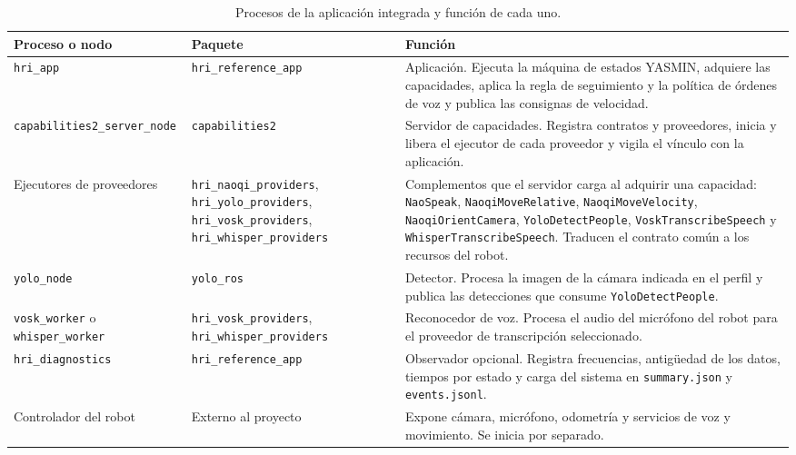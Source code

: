 \documentclass[11pt,letterpaper]{article}
\newcommand{\code}[1]{\nolinkurl{#1}}
\begin{document}
\begin{table}[htbp]
\centering\small
\caption{Procesos de la aplicación integrada y función de cada uno.}\label{tab:nodos}
\begin{tabularx}{\linewidth}{@{}P{3.6cm}P{3.3cm}Y@{}}
\toprule
Proceso o nodo & Paquete & Función \\
\midrule
\code{hri_app} & \code{hri_reference_app} & Aplicación. Ejecuta la máquina de estados YASMIN, adquiere las capacidades, aplica la regla de seguimiento y la política de órdenes de voz y publica las consignas de velocidad. \\
\code{capabilities2_server_node} & \code{capabilities2} & Servidor de capacidades. Registra contratos y proveedores, inicia y libera el ejecutor de cada proveedor y vigila el vínculo con la aplicación. \\
Ejecutores de proveedores & \code{hri_naoqi_providers}, \code{hri_yolo_providers}, \code{hri_vosk_providers}, \code{hri_whisper_providers} & Complementos que el servidor carga al adquirir una capacidad: \code{NaoSpeak}, \code{NaoqiMoveRelative}, \code{NaoqiMoveVelocity}, \code{NaoqiOrientCamera}, \code{YoloDetectPeople}, \code{VoskTranscribeSpeech} y \code{WhisperTranscribeSpeech}. Traducen el contrato común a los recursos del robot. \\
\code{yolo_node} & \code{yolo_ros} & Detector. Procesa la imagen de la cámara indicada en el perfil y publica las detecciones que consume \code{YoloDetectPeople}. \\
\code{vosk_worker} o \code{whisper_worker} & \code{hri_vosk_providers}, \code{hri_whisper_providers} & Reconocedor de voz. Procesa el audio del micrófono del robot para el proveedor de transcripción seleccionado. \\
\code{hri_diagnostics} & \code{hri_reference_app} & Observador opcional. Registra frecuencias, antigüedad de los datos, tiempos por estado y carga del sistema en \code{summary.json} y \code{events.jsonl}. \\
Controlador del robot & Externo al proyecto & Expone cámara, micrófono, odometría y servicios de voz y movimiento. Se inicia por separado. \\
\bottomrule
\end{tabularx}
\end{table}
\end{document}
